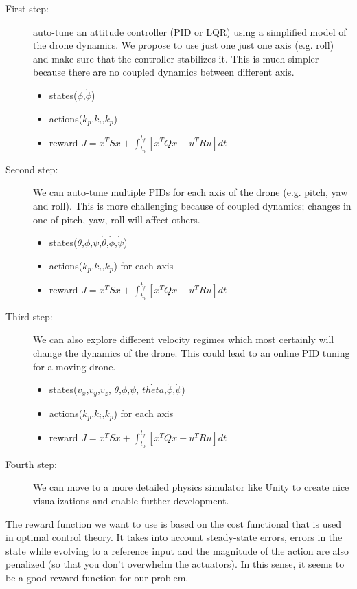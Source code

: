 \documentclass{article}
\begin{document}
 \begin{description}
    \item[First step:] auto-tune an attitude controller (PID or LQR) using a simplified model of the drone dynamics. We propose to use just one just one axis (e.g. roll) and make sure that the controller stabilizes it. This is much simpler because there are no coupled dynamics between different axis.
    \begin{itemize}
        \item states($\phi$,$\dot{\phi}$)
        \item actions($k_p$,$k_i$,$k_p$)
        \item reward $J = x^TSx + \int_{t_0}^{t_f} [x^TQx + u^TRu] dt$
    \end{itemize}
    \item[Second step:] We can auto-tune multiple PIDs for each axis of the drone (e.g. pitch, yaw and roll). This is more challenging because of coupled dynamics; changes in one of pitch, yaw, roll will affect others. 
    \begin{itemize}
        \item states($\theta$,$\phi$,$\psi$,$\dot{\theta}$,$\dot{\phi}$,$\dot{\psi}$)
        \item actions($k_p$,$k_i$,$k_p$) for each axis
        \item reward $J = x^TSx + \int_{t_0}^{t_f} [x^TQx + u^TRu] dt$
    \end{itemize}
    \item[Third step:] We can also explore different velocity regimes which most certainly will change the dynamics of the drone. This could lead to an online PID tuning for a moving drone.
    \begin{itemize}
        \item states($v_x$,$v_y$,$v_z$,
                    $\theta$,$\phi$,$\psi$,
                    $\dot{theta}$,$\dot{\phi}$,$\dot{\psi}$)
        \item actions($k_p$,$k_i$,$k_p$) for each axis
        \item reward $J = x^TSx + \int_{t_0}^{t_f} [x^TQx + u^TRu] dt$
    \end{itemize}
    \item[Fourth step:] We can move to a more detailed physics simulator like Unity to create nice visualizations and enable further development.
 \end{description}

The reward function we want to use is based on the cost functional that is 
used in optimal control theory. It takes into account steady-state errors,
errors in the state while evolving to a reference input and the magnitude of 
the action are also penalized (so that you don't overwhelm the actuators). In 
this sense, it seems to be a good reward function for our problem.
\end{document}

